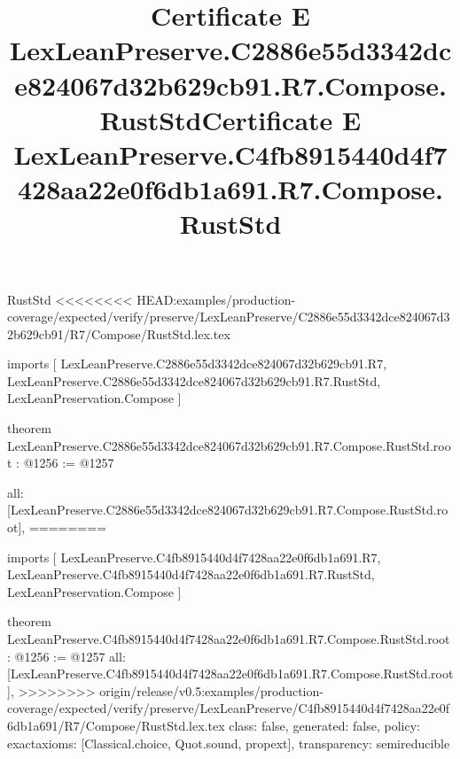 \begin{lexlean}{RustStd}
<<<<<<<< HEAD:examples/production-coverage/expected/verify/preserve/LexLeanPreserve/C2886e55d3342dce824067d32b629cb91/R7/Compose/RustStd.lex.tex
\title{Certificate E LexLeanPreserve.C2886e55d3342dce824067d32b629cb91.R7.Compose.RustStd}
\begin{coremodule}
imports [
  LexLeanPreserve.C2886e55d3342dce824067d32b629cb91.R7,
  LexLeanPreserve.C2886e55d3342dce824067d32b629cb91.R7.RustStd,
  LexLeanPreservation.Compose
]

theorem LexLeanPreserve.C2886e55d3342dce824067d32b629cb91.R7.Compose.RustStd.root : @1256 := @1257 {
  all: [LexLeanPreserve.C2886e55d3342dce824067d32b629cb91.R7.Compose.RustStd.root],
========
\title{Certificate E LexLeanPreserve.C4fb8915440d4f7428aa22e0f6db1a691.R7.Compose.RustStd}
\begin{coremodule}
imports [
  LexLeanPreserve.C4fb8915440d4f7428aa22e0f6db1a691.R7,
  LexLeanPreserve.C4fb8915440d4f7428aa22e0f6db1a691.R7.RustStd,
  LexLeanPreservation.Compose
]

theorem LexLeanPreserve.C4fb8915440d4f7428aa22e0f6db1a691.R7.Compose.RustStd.root : @1256 := @1257 {
  all: [LexLeanPreserve.C4fb8915440d4f7428aa22e0f6db1a691.R7.Compose.RustStd.root],
>>>>>>>> origin/release/v0.5:examples/production-coverage/expected/verify/preserve/LexLeanPreserve/C4fb8915440d4f7428aa22e0f6db1a691/R7/Compose/RustStd.lex.tex
  class: false,
  generated: false,
  policy: exact{axioms: [Classical.choice, Quot.sound, propext]},
  transparency: semireducible
}


\end{coremodule}}
\end{coremodule}
\end{lexlean}
